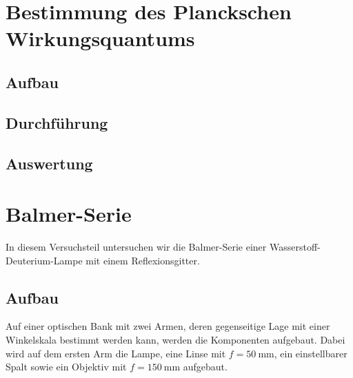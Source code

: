 
\FloatBarrier
\section{Bestimmung des Planckschen Wirkungsquantums}

\FloatBarrier
\subsection{Aufbau}

\begin{figure}[htbp]
    \centering
    \caption{%
        \cite[Abbildung~P402.1]{physik412-Anleitung}
    }
    \label{fig:P402.1}
\end{figure}

\FloatBarrier
\subsection{Durchführung}

\FloatBarrier
\subsection{Auswertung}


\FloatBarrier
\section{Balmer-Serie}

In diesem Versuchsteil untersuchen wir die Balmer-Serie einer
Wasserstoff-Deuterium-Lampe mit einem Reflexionsgitter.

\FloatBarrier
\subsection{Aufbau}

Auf einer optischen Bank mit zwei Armen, deren gegenseitige Lage mit einer
Winkelskala bestimmt werden kann, werden die Komponenten aufgebaut. Dabei wird
auf dem ersten Arm die Lampe, eine Linse mit $f = \SI{50}{\milli\meter}$, ein
einstellbarer Spalt sowie ein Objektiv mit $f = \SI{150}{\milli\meter}$
aufgebaut.

